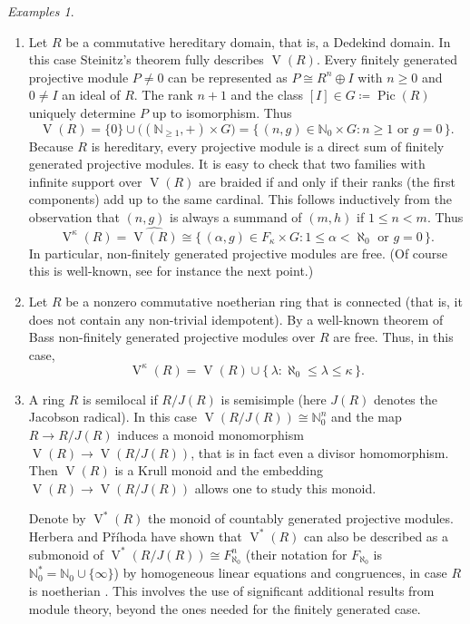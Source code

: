 \documentclass[a4paper,11pt,oneside]{amsart}
\theoremstyle{remark}
\newtheorem{examples}[teor]{Examples}
\newcommand{\bN}{\mathbb N}
\DeclareMathOperator{\Pic}{Pic}
\DeclareMathOperator{\Vmon}{V}
\begin{document}
\begin{examples}
\begin{enumerate}
  \item Let $R$ be a commutative hereditary domain, that is, a Dedekind domain.
    In this case Steinitz's theorem fully describes $\Vmon(R)$.
    Every finitely generated projective module $P \ne 0$ can be represented as $P \cong R^n \oplus I$ with $n \ge 0$ and $0 \ne I$ an ideal of $R$.
    The rank $n+1$ and the class $[I] \in G\coloneqq \Pic(R)$ uniquely determine $P$ up to isomorphism.
    Thus
    \[
      \Vmon(R) = \{0\} \cup \big((\bN_{\ge 1},+) \times G\big) = \big\{\, (n,g) \in \bN_0 \times G : n \ge 1 \text{ or } g = 0\,\big\}.
    \]
    Because $R$ is hereditary, every projective module is a direct sum of finitely generated projective modules.
    It is easy to check that two families with infinite support over $\Vmon(R)$ are braided if and only if their ranks (the first components) add up to the same cardinal.
    This follows inductively from the observation that $(n,g)$ is always a summand of $(m,h)$ if $1 \le n < m$.
    Thus
    \[
      \Vmon^{\kappa}(R) = \widehat{\Vmon(R)} \cong \{\, (\alpha,g) \in F_\kappa \times G : 1 \le \alpha < \aleph_0 \text{ or } g = 0\,\}.
    \]
    In particular, non-finitely generated projective modules are free.
    (Of course this is well-known, see for instance the next point.)

  \item 
    Let $R$ be a nonzero commutative noetherian ring that is connected (that is, it does not contain any non-trivial idempotent).
    By a well-known theorem of Bass \cite[Corollary 4.5]{Bass63} non-finitely generated projective modules over $R$ are free.
    Thus, in this case,
    \[
      \Vmon^{\kappa}(R) = \Vmon(R) \cup \{\, \lambda : \aleph_0 \le \lambda \le \kappa \,\}.
    \]
    

  \item \label{modexm:semilocalnoetherian}
    A ring $R$ is semilocal if $R/J(R)$ is semisimple (here $J(R)$ denotes the Jacobson radical).
    In this case $\Vmon(R/J(R)) \cong \bN_0^n$ and the map $R \to R/J(R)$ induces a monoid monomorphism $\Vmon(R) \to \Vmon(R/J(R))$, that is in fact even a divisor homomorphism.
    Then $\Vmon(R)$ is a Krull monoid and the embedding $\Vmon(R) \to \Vmon(R/J(R))$ allows one to study this monoid.

    Denote by $\Vmon^*(R)$ the monoid of countably generated projective modules.
    Herbera and Příhoda have shown that $\Vmon^*(R)$ can also be described as a submonoid of $\Vmon^*(R/J(R)) \cong F_{\aleph_0}^n$ (their notation for $F_{\aleph_0}$ is $\bN_0^*= \bN_0 \cup \{\infty\}$) by homogeneous linear equations and congruences, in case $R$ is noetherian \cite[Theorem 2.6]{PavelHerbera}.
    This involves the use of significant additional results from module theory, beyond the ones needed for the finitely generated case.
    

\end{enumerate}
\end{examples}
\end{document}
